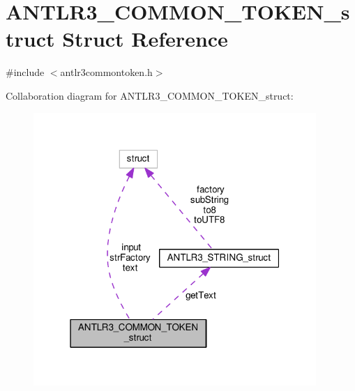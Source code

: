 \hypertarget{struct_a_n_t_l_r3___c_o_m_m_o_n___t_o_k_e_n__struct}{\section{A\-N\-T\-L\-R3\-\_\-\-C\-O\-M\-M\-O\-N\-\_\-\-T\-O\-K\-E\-N\-\_\-struct Struct Reference}
\label{struct_a_n_t_l_r3___c_o_m_m_o_n___t_o_k_e_n__struct}
}


{\ttfamily \#include $<$antlr3commontoken.\-h$>$}



Collaboration diagram for A\-N\-T\-L\-R3\-\_\-\-C\-O\-M\-M\-O\-N\-\_\-\-T\-O\-K\-E\-N\-\_\-struct\-:
\nopagebreak
\begin{figure}[H]
\begin{center}
\leavevmode
\includegraphics[width=304pt]{struct_a_n_t_l_r3___c_o_m_m_o_n___t_o_k_e_n__struct__coll__graph}
\end{center}
\end{figure}
